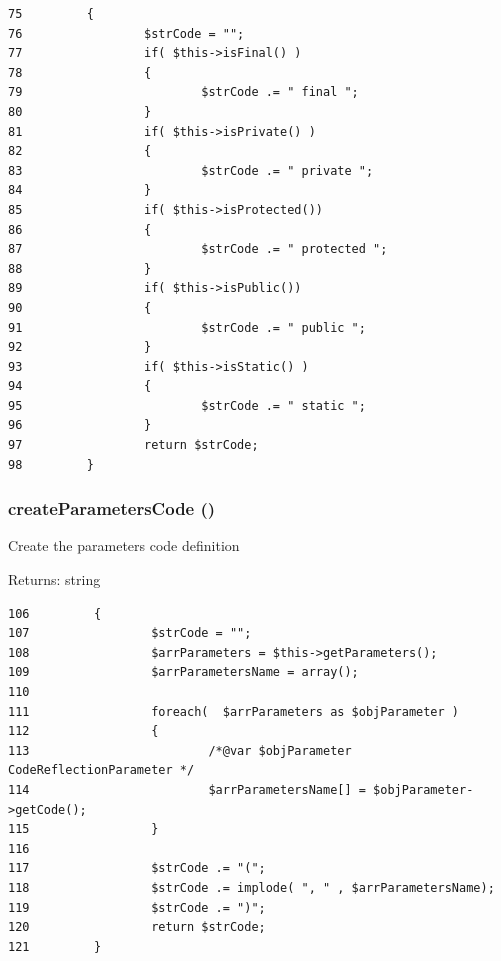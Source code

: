\begin{Code}\begin{verbatim}75         {
76                 $strCode = "";
77                 if( $this->isFinal() )
78                 {
79                         $strCode .= " final ";
80                 }
81                 if( $this->isPrivate() )
82                 {
83                         $strCode .= " private ";
84                 }
85                 if( $this->isProtected())
86                 {
87                         $strCode .= " protected ";
88                 }
89                 if( $this->isPublic())
90                 {
91                         $strCode .= " public ";
92                 }
93                 if( $this->isStatic() )
94                 {
95                         $strCode .= " static ";
96                 }
97                 return $strCode;
98         }
\end{verbatim}
\end{Code}


\hypertarget{class_code_reflection_method_bcae75d179d0d3b4c5d5aafcd3f3bcdc}{
\subsubsection[{createParametersCode}]{\setlength{\rightskip}{0pt plus 5cm}createParametersCode ()}}
\label{class_code_reflection_method_bcae75d179d0d3b4c5d5aafcd3f3bcdc}


Create the parameters code definition

\begin{Desc}
\item[Returns:]string \end{Desc}


\begin{Code}\begin{verbatim}106         {
107                 $strCode = "";
108                 $arrParameters = $this->getParameters();
109                 $arrParametersName = array();
110 
111                 foreach(  $arrParameters as $objParameter )
112                 {
113                         /*@var $objParameter CodeReflectionParameter */
114                         $arrParametersName[] = $objParameter->getCode();
115                 }
116 
117                 $strCode .= "(";
118                 $strCode .= implode( ", " , $arrParametersName);
119                 $strCode .= ")";
120                 return $strCode;
121         }
\end{verbatim}
\end{Code}


